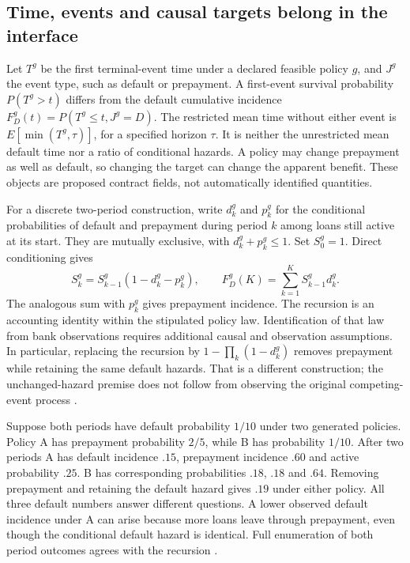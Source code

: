 \subsection{Time, events and causal targets belong in the interface}

Let $T^g$ be the first terminal-event time under a declared feasible policy
$g$, and $J^g$ the event type, such as default or prepayment. A first-event
survival probability $P(T^g>t)$ differs from the default cumulative incidence
$F_D^g(t)=P(T^g\leq t,J^g=D)$. The restricted mean time without either event
is $E[\min(T^g,\tau)]$, for a specified horizon $\tau$. It is neither the
unrestricted mean default time nor a ratio of conditional hazards. A policy
may change prepayment as well as default, so changing the target can change
the apparent benefit. These objects are proposed contract fields, not
automatically identified quantities.

For a discrete two-period construction, write $d_k^g$ and $p_k^g$ for the
conditional probabilities of default and prepayment during period $k$ among
loans still active at its start. They are mutually exclusive, with
$d_k^g+p_k^g\leq1$. Set $S_0^g=1$. Direct conditioning gives
\[
 S_k^g=S_{k-1}^g(1-d_k^g-p_k^g),\qquad
 F_D^g(K)=\sum_{k=1}^K S_{k-1}^g d_k^g.
\]
The analogous sum with $p_k^g$ gives prepayment incidence. The recursion is
an accounting identity within the stipulated policy law. Identification of
that law from bank observations requires additional causal and observation
assumptions. In particular, replacing the recursion by
$1-\prod_k(1-d_k^g)$ removes prepayment while retaining the same default
hazards. That is a different construction; the unchanged-hazard premise
does not follow from observing the original competing-event process
\citep{exec14_survival_exact}.

Suppose both periods have default probability $1/10$ under two generated
policies. Policy A has prepayment probability $2/5$, while B has probability
$1/10$. After two periods A has default incidence $.15$, prepayment incidence
$.60$ and active probability $.25$. B has corresponding probabilities $.18$,
$.18$ and $.64$. Removing prepayment and retaining the default hazard gives
$.19$ under either policy. All three default numbers answer different
questions. A lower observed default incidence under A can arise because more
loans leave through prepayment, even though the conditional default hazard
is identical. Full enumeration of both period outcomes agrees with the
recursion \citep{exec14_survival_exact}.

